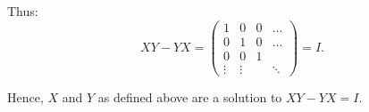 \documentclass[11pt]{amsart}
\begin{document}
\begin{enumerate}
Thus:
$$
XY-YX = \left( \begin{array}{cccc}
            1 & 0 & 0 & \ldots \\
            0 & 1 & 0 & \ldots   \\
            0 & 0 & 1 &  \\
            \vdots & \vdots & & \ddots
            \end{array} \right) = I.
$$
          
Hence, $X$ and $Y$ as defined above are a solution to
$XY-YX=I$.
\end{enumerate}
\end{document}
